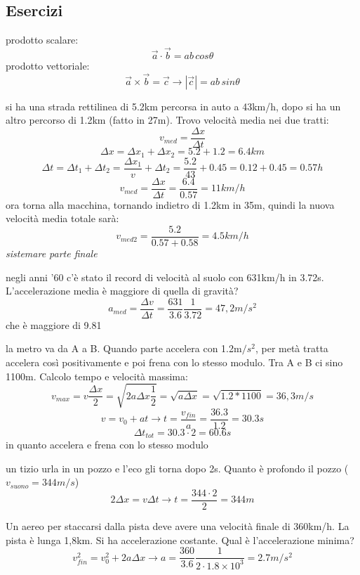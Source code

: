 \documentclass[a4paper,12pt, oneside]{book}
\begin{document}
\subsection{Esercizi}
prodotto scalare:
$$\vec{a} \cdot \vec{b}=ab\,cos\theta$$
prodotto vettoriale:
$$\vec{a} \times \vec{b}=\vec{c}\to |\vec{c}|=ab\,sin\theta$$
\begin{esercizio}
si ha una strada rettilinea di 5.2km percorsa in auto a 43km/h, dopo si ha un altro percorso di 1.2km (fatto in 27m). Trovo velocità media nei due tratti:\\
$$v_{med}=\frac{\Delta x}{\Delta t}$$
$$\Delta x = \Delta x_1+\Delta x_2= 5.2+1.2=6.4km$$
$$\Delta t = \Delta t_1+\Delta t_2= \frac{\Delta x_1}{v}+\Delta t_2=\frac{5.2}{43}+0.45=0.12+0.45=0.57h$$
$$v_{med}=\frac{\Delta x}{\Delta t}=\frac{6.4}{0.57}=11km/h$$
ora torna alla macchina, tornando indietro di 1.2km in 35m, quindi la nuova velocità media totale sarà:
$$v_{med2}=\frac{5.2}{0.57+0.58}=4.5km/h$$
\textit{sistemare parte finale}
\end{esercizio}
\begin{esercizio}
negli anni '60 c'è stato il record di velocità al suolo con 631km/h in 3.72s. L'accelerazione media è maggiore di quella di gravità?
$$a_{med}=\frac{\Delta v}{\Delta t}=\frac{631}{3.6}\frac{1}{3.72}=47,2m/s^2$$
che è maggiore di 9.81
\end{esercizio}
\begin{esercizio}
la metro va da A a B. Quando parte accelera con 1.2m$/s^2$, per metà tratta accelera così positivamente e poi frena con lo stesso modulo. Tra A e B ci sino 1100m. Calcolo tempo e velocità massima:
$$v_{max}=v\frac{\Delta x}{2}=\sqrt{2a\Delta x\frac{1}{2}}=\sqrt{a\Delta x}=\sqrt{1.2*1100}=36,3m/s$$
$$v=v_0+at\to t=\frac{v_{fin}}{a}=\frac{36.3}{1.2}=30.3s$$
$$\Delta t_{tot}=30.3\cdot 2= 60.6s$$
in quanto accelera e frena con lo stesso modulo
\end{esercizio}
\begin{esercizio}
un tizio urla in un pozzo e l'eco gli torna dopo 2s. Quanto è profondo il pozzo ($v_{suono}=344m/s$)
$$2\Delta x= v\Delta t\to t=\frac{344\cdot 2}{2}=344m$$
\end{esercizio}
\begin{esercizio}
Un aereo per staccarsi dalla pista deve avere una velocità finale di 360km/h. La pista è lunga 1,8km. Si ha accelerazione costante. Qual è l'accelerazione minima?
$$v_{fin}^2=v_0^2+2a\Delta x\to a=\frac{360}{3.6}\frac{1}{2\cdot 1.8\times 10^3}=2.7m/s^2$$
\end{esercizio}
\end{document}
